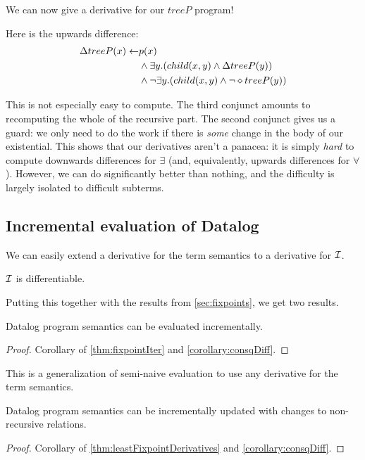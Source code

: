 We can now give a derivative for our $treeP$ program!

Here is the upwards difference:
\begin{align*}
  \Delta treeP(x) \leftarrow & p(x)\\
    &\wedge
    \exists y. (
      child(x, y)
      \wedge
      \Delta treeP(y)
    )\\
    &\wedge 
    \neg \exists y. (
      child(x, y)
      \wedge
      \neg \diamond treeP(y)
    )
\end{align*}

This is not especially easy to compute. The third conjunct amounts to
recomputing the whole of the recursive part. The second conjunct gives us a
guard: we only need to do the work if there is \emph{some} change in the body of
our existential. This shows that our derivatives aren't a panacea: it is simply \emph{hard} to compute
downwards differences for $\exists$ (and, equivalently, upwards differences for
$\forall$). However, we can do significantly better than nothing, and the
difficulty is largely isolated to difficult subterms.

\subsection{Incremental evaluation of Datalog}

We can easily extend a derivative for the term semantics to a derivative for $\mathcal{I}$.

\begin{corollary}
\label{corollary:consqDiff}
  $\mathcal{I}$ is differentiable.
\end{corollary}

Putting this together with the results from \cref{sec:fixpoints}, we get two results.

\begin{thm}
\label{thm:diffEval}
  Datalog program semantics can be evaluated incrementally.
\end{thm}
\ifproofs
\begin{proof}
  Corollary of \cref{thm:fixpointIter} and \cref{corollary:consqDiff}.
\end{proof}
\fi

This is a generalization of semi-naive evaluation to use any derivative for the
term semantics.

\begin{thm}
\label{thm:diffUpdate}
  Datalog program semantics can be incrementally updated with changes to non-recursive relations.
\end{thm}
\ifproofs
\begin{proof}
  Corollary of \cref{thm:leastFixpointDerivatives} and \cref{corollary:consqDiff}.
\end{proof}
\fi

